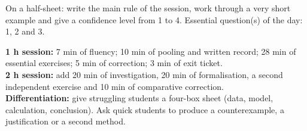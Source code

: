 \begin{exitticket}[3 minutes]On a half-sheet: write the main rule of the session, work through a very short example and give a confidence level from 1 to 4. Essential question(s) of the day: 1, 2 and 3.\end{exitticket}

\ifmxteacher
\begin{method}
\textbf{1 h session:} 7 min of fluency; 10 min of pooling and written record; 28 min of essential exercises; 5 min of correction; 3 min of exit ticket.\\
\textbf{2 h session:} add 20 min of investigation, 20 min of formalisation, a second independent exercise and 10 min of comparative correction.\\
\textbf{Differentiation:} give struggling students a four-box sheet (data, model, calculation, conclusion). Ask quick students to produce a counterexample, a justification or a second method.
\end{method}
\fi
